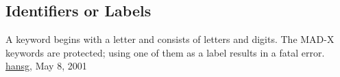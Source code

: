 




\subsection{Identifiers or Labels}
A keyword begins with a letter and consists of letters and digits. The MAD-X keywords are protected; using one of them as a label results in a fatal error.  
\\
\href{http://www.cern.ch/Hans.Grote/hansg_sign.html}{hansg}, May 8, 2001 

